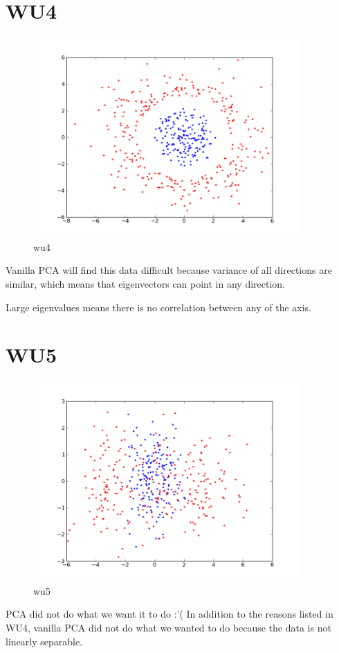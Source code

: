 \section*{WU4}
\begin{figure}[here]
	\center
	\caption{wu4}
	\label{fig:wu4}
	\includegraphics[width=4.0in]{img/wu4.png}
\end{figure}

Vanilla PCA will find this data difficult because variance of all directions are similar, 
which means that eigenvectors can point in any direction. 

Large eigenvalues means there is no correlation between any of the axis. 

\section*{WU5}
\begin{figure}[here]
	\center
	\caption{wu5}
	\label{fig:wu5}
	\includegraphics[width=4.0in]{img/wu5.png}
\end{figure}
PCA did not do what we want it to do :'(
In addition to the reasons listed in WU4, vanilla PCA 
did not do what we wanted to do because the data 
is not linearly separable.

